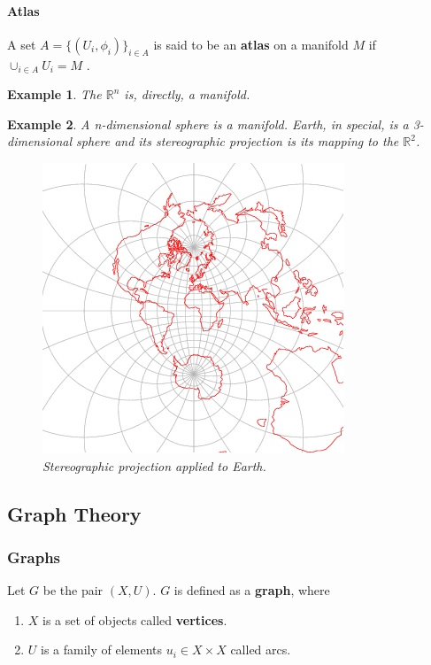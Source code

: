 \documentclass[12pt]{article}
\newtheorem{example}{Example}[section]
\begin{document}
\paragraph{Atlas}

A set $A = \{(U_i, \phi_i)\}_{i \in A}$ is said to be an \textbf{atlas} on a manifold $M$ if $\cup_{i \in A} U_i = M$ \cite{lee2012}.

\begin{example}
	The $\mathbb{R}^n$ is, directly, a manifold.
\end{example}

\begin{example}
	A n-dimensional sphere is a manifold. Earth, in special, is a 3-dimensional sphere and its stereographic projection is its mapping to the $\mathbb{R}^2$. \cite{stereo_proj}

	\begin{figure}[H]
		\centering
		\captionsetup{justification=centering}

		\includegraphics[scale=.8]{stereo_earth}
		\caption{Stereographic projection applied to Earth.}
		\label{fig:stereographic_earth}
	\end{figure}
\end{example}

\subsection{Graph Theory}
\subsubsection{Graphs}

Let $G$ be the pair $(X, U)$. $G$ is defined as a \textbf{graph}, \cite{berge1973} where
\begin{enumerate}
	\item $X$ is a set of objects called \textbf{vertices}.
	\item $U$ is a family of elements $u_i \in X\times X$ called arcs.
\end{enumerate}
\end{document}

